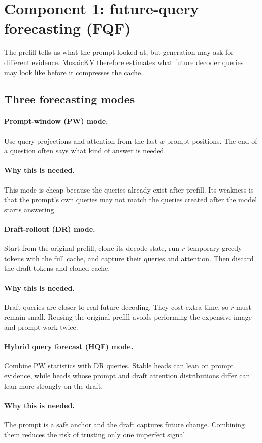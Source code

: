 \documentclass[11pt]{article}
\newcommand{\why}{\paragraph{Why this is needed.}}
\begin{document}
\section{Component 1: future-query forecasting (FQF)}
\label{sec:forecast}

The prefill tells us what the prompt looked at, but generation may ask for different evidence.
MosaicKV therefore estimates what future decoder queries may look like before it compresses the
cache.

\subsection{Three forecasting modes}

\paragraph{Prompt-window (PW) mode.} Use query projections and attention from the last $w$ prompt
positions. The end of a question often says what kind of answer is needed.

\why This mode is cheap because the queries already exist after prefill. Its weakness is that the
prompt's own queries may not match the queries created after the model starts answering.

\paragraph{Draft-rollout (DR) mode.} Start from the original prefill, clone its decode state, run $r$
temporary greedy tokens with the full cache, and capture their queries and attention. Then discard
the draft tokens and cloned cache.

\why Draft queries are closer to real future decoding. They cost extra time, so $r$ must remain
small. Reusing the original prefill avoids performing the expensive image and prompt work twice.

\paragraph{Hybrid query forecast (HQF) mode.} Combine PW statistics with DR queries. Stable heads can
lean on prompt evidence, while heads whose prompt and draft attention distributions differ can
lean more strongly on the draft.

\why The prompt is a safe anchor and the draft captures future change. Combining them reduces the
risk of trusting only one imperfect signal.
\end{document}
